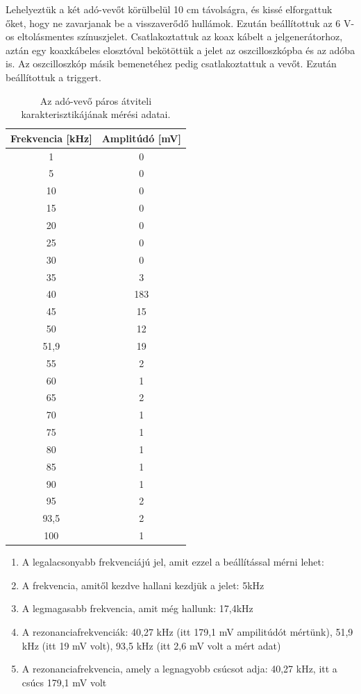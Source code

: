 \documentclass{article}
\begin{document}
Lehelyeztük a két adó-vevőt körülbelül 10 cm távolságra, és kissé elforgattuk őket, hogy ne zavarjanak be a visszaverődő hullámok. Ezután beállítottuk az 6 V-os eltolásmentes színuszjelet. Csatlakoztattuk az koax kábelt a jelgenerátorhoz, aztán egy koaxkábeles elosztóval bekötöttük a jelet az oszcilloszkópba és az adóba is. Az oszcilloszkóp másik bemenetéhez pedig csatlakoztattuk a vevőt. Ezután beállítottuk a triggert.

\begin{table}[h!]
    \centering
    \begin{tabular}{|c|c|}
        \hline
        Frekvencia [kHz] & Amplitúdó [mV] \\ \hline
        1 & 0 \\ \hline 
        5 & 0\\ \hline
        10 & 0\\ \hline 
        15 & 0\\ \hline
        20 & 0\\ \hline
        25 & 0\\ \hline
        30 & 0\\ \hline
        35 & 3 \\ \hline
        40 & 183\\ \hline
        45 & 15\\ \hline
        50 & 12\\ \hline
        51,9 & 19\\ \hline
        55 & 2\\ \hline
        60 & 1\\ \hline
        65 & 2\\ \hline
        70 & 1\\ \hline
        75 & 1\\ \hline
        80 & 1\\ \hline
        85 & 1\\ \hline
        90 & 1\\ \hline
        95 & 2\\ \hline
        93,5 & 2\\ \hline
        100 & 1\\ \hline
    \end{tabular}
    \caption{Az adó-vevő páros átviteli karakterisztikájának mérési adatai.}
    \label{tab:atviteli_karakterisztika}
\end{table}


\begin{enumerate}
    \item A legalacsonyabb frekvenciájú jel, amit ezzel a beállítással mérni lehet: 
    \item A frekvencia, amitől kezdve hallani kezdjük a jelet: 5kHz
    \item A legmagasabb frekvencia, amit még hallunk: 17,4kHz
    \item A rezonanciafrekvenciák: 40,27 kHz (itt 179,1 mV ampilitúdót mértünk), 51,9 kHz (itt 19 mV  volt), 93,5 kHz (itt 2,6 mV volt a mért adat)
    \item A rezonanciafrekvencia, amely a legnagyobb csúcsot adja: 40,27 kHz, itt a csúcs 179,1 mV volt
\end{enumerate}
\end{document}
